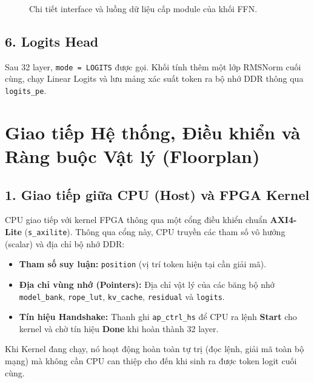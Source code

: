 \documentclass[12pt,a4paper]{article}
\begin{document}
\begin{figure}[H]
{
}
\caption{Chi tiết interface và luồng dữ liệu cấp module của khối FFN.}
\end{figure}

\subsection{6. Logits Head}
Sau 32 layer, \texttt{mode = LOGITS} được gọi. Khối tính thêm một lớp RMSNorm cuối cùng, chạy Linear Logits và lưu mảng xác suất token ra bộ nhớ DDR thông qua \texttt{logits\_pe}.

\section{Giao tiếp Hệ thống, Điều khiển và Ràng buộc Vật lý (Floorplan)}

\subsection{1. Giao tiếp giữa CPU (Host) và FPGA Kernel}
CPU giao tiếp với kernel FPGA thông qua một cổng điều khiển chuẩn \textbf{AXI4-Lite} (\texttt{s\_axilite}). 
Thông qua cổng này, CPU truyền các tham số vô hướng (scalar) và địa chỉ bộ nhớ DDR:
\begin{itemize}
    \item \textbf{Tham số suy luận:} \texttt{position} (vị trí token hiện tại cần giải mã).
    \item \textbf{Địa chỉ vùng nhớ (Pointers):} Địa chỉ vật lý của các băng bộ nhớ \texttt{model\_bank}, \texttt{rope\_lut}, \texttt{kv\_cache}, \texttt{residual} và \texttt{logits}.
    \item \textbf{Tín hiệu Handshake:} Thanh ghi \texttt{ap\_ctrl\_hs} để CPU ra lệnh \textbf{Start} cho kernel và chờ tín hiệu \textbf{Done} khi hoàn thành 32 layer.
\end{itemize}
Khi Kernel đang chạy, nó hoạt động hoàn toàn tự trị (đọc lệnh, giải mã toàn bộ mạng) mà không cần CPU can thiệp cho đến khi sinh ra được token logit cuối cùng.
\end{document}
